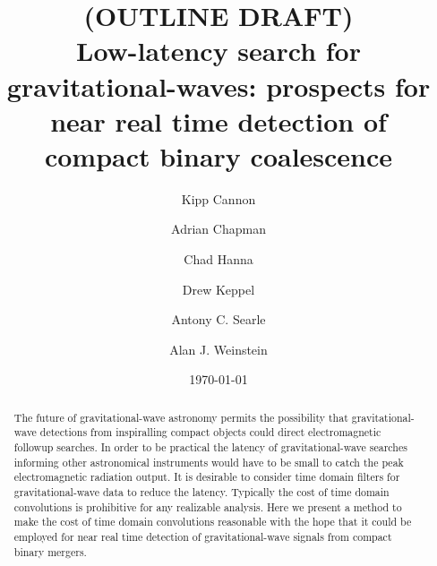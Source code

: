 \documentclass[aps,prd,showpacs,groupedaddress,showkeys,preprintnumbers]{revtex4}
\begin{document}
\title{(OUTLINE DRAFT)\\ Low-latency search for gravitational-waves: prospects for near real time detection of compact binary coalescence}

\date{\today}

\author{Kipp Cannon}

\author{Adrian Chapman}

\author{Chad Hanna}

\author{Drew Keppel}

\author{Antony C. Searle}

\author{Alan J. Weinstein}


\begin{abstract}
The future of gravitational-wave astronomy permits the possibility that 
gravitational-wave detections from inspiralling compact objects could direct
electromagnetic followup searches. In order to be practical the latency of
gravitational-wave searches informing other astronomical instruments 
would have to be small to catch the peak electromagnetic radiation output. 
It is desirable to consider time domain filters for gravitational-wave data
to reduce the latency.   Typically the cost of time domain convolutions 
is prohibitive for any realizable analysis.  Here we present a method to
make the cost of time domain convolutions reasonable with the hope that it
could be employed for near real time detection of gravitational-wave signals
from compact binary mergers.  
\end{abstract}

\pacs{}


\preprint{}

\maketitle
\end{document}
